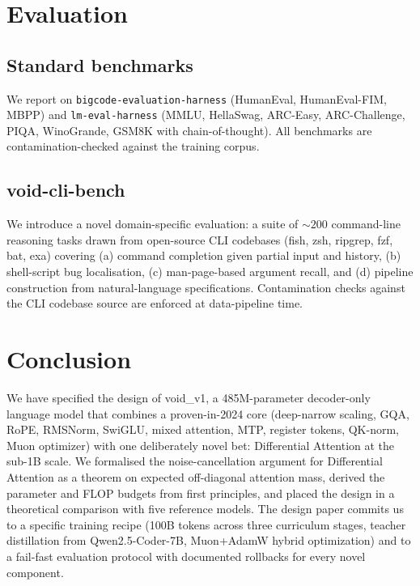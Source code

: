 \documentclass[11pt,a4paper]{article}
\theoremstyle{definition}
\theoremstyle{remark}
\begin{document}
\section{Evaluation}
\label{sec:eval}

\subsection{Standard benchmarks}
We report on \texttt{bigcode-evaluation-harness} (HumanEval, HumanEval-FIM,
MBPP) and \texttt{lm-eval-harness} (MMLU, HellaSwag, ARC-Easy,
ARC-Challenge, PIQA, WinoGrande, GSM8K with chain-of-thought). All
benchmarks are contamination-checked against the training corpus.

\subsection{void-cli-bench}

We introduce a novel domain-specific evaluation: a suite of $\sim 200$
command-line reasoning tasks drawn from open-source CLI codebases (fish,
zsh, ripgrep, fzf, bat, exa) covering (a) command completion given partial
input and history, (b) shell-script bug localisation, (c) man-page-based
argument recall, and (d) pipeline construction from natural-language
specifications. Contamination checks against the CLI codebase source are
enforced at data-pipeline time.

\section{Conclusion}
\label{sec:conclusion}

We have specified the design of void\_v1, a 485M-parameter decoder-only
language model that combines a proven-in-2024 core (deep-narrow scaling,
GQA, RoPE, RMSNorm, SwiGLU, mixed attention, MTP, register tokens,
QK-norm, Muon optimizer) with one deliberately novel bet: Differential
Attention at the sub-1B scale. We formalised the noise-cancellation
argument for Differential Attention as a theorem on expected off-diagonal
attention mass, derived the parameter and FLOP budgets from first
principles, and placed the design in a theoretical comparison with five
reference models. The design paper commits us to a specific training
recipe (100B tokens across three curriculum stages, teacher distillation
from Qwen2.5-Coder-7B, Muon+AdamW hybrid optimization) and to a fail-fast
evaluation protocol with documented rollbacks for every novel component.
\end{document}

